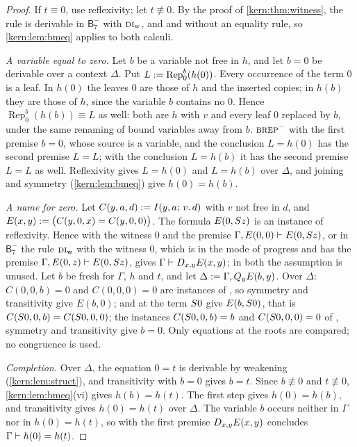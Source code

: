 \begin{proof}
If $t\equiv 0$, use reflexivity; let $t\not\equiv 0$.  By the proof of
\cref{kern:thm:witness}, the rule  is derivable in
$\mathsf{B}^{-}_{7}$ with $\rulename{DI}_{\mathrm{w}}$,  and
 and without an equality rule, so \cref{kern:lem:bmeq} applies
to both calculi.

\emph{A variable equal to zero.}  Let $b$ be a variable not free in $h$, and
let $b=0$ be derivable over a context $\Delta$.  Put
$L\mathrel{:=}\operatorname{Rep}_{0}^{b}(h(0))$.  Every occurrence of the term $0$
is a leaf.  In $h(0)$ the leaves $0$ are those of $h$ and the inserted
copies; in $h(b)$ they are those of $h$, since the variable $b$ contains no
$0$.  Hence $\operatorname{Rep}_{0}^{b}(h(b))\equiv L$ as well: both are $h$
with $v$ and every leaf $0$ replaced by $b$, under the same renaming of bound
variables away from $b$.  $\rulename{BRep}^{-}$ with the first premise $b=0$,
whose source is a variable, and the conclusion $L=h(0)$ has the second
premise $L=L$; with the conclusion $L=h(b)$ it has the second premise $L=L$
as well.  Reflexivity gives $L=h(0)$ and $L=h(b)$ over $\Delta$, and joining
and symmetry (\cref{kern:lem:bmeq}) give $h(0)=h(b)$.

\emph{A name for zero.}  Let $C(y,a,d)\mathrel{:=}I(y,a;\,v.\,d)$ with $v$ not
free in $d$, and $E(x,y)\mathrel{:=}\bigl(C(y,0,x)=C(y,0,0)\bigr)$.  The formula
$E(0,S z)$ is an instance of reflexivity.  Hence  with the
witness $0$ and the premise $\Gamma,E(0,0)\vdash E(0,S z)$, or in
$\mathsf{B}^{-}_{7}$ the rule $\rulename{DI}_{\mathrm{w}}$ with the witness
$0$, which is in the mode of progress and has the premise
$\Gamma,E(0,z)\vdash E(0,S z)$, gives $\Gamma\vdash D_{x,y}E(x,y)$; in
both the assumption is unused.  Let $b$ be fresh for $\Gamma$, $h$ and $t$,
and let $\Delta\mathrel{:=}\Gamma,Q_{y}E(b,y)$.  Over $\Delta$:
$C(0,0,b)=0$ and $C(0,0,0)=0$ are instances of , so symmetry
and transitivity give $E(b,0)$;  and  at the term
$S 0$ give $E(b,S 0)$, that is $C(S 0,0,b)=C(S 0,0,0)$; the
instances $C(S 0,0,b)=b$ and $C(S 0,0,0)=0$ of , symmetry
and transitivity give $b=0$.  Only equations at the roots are compared;
no congruence is used.

\emph{Completion.}  Over $\Delta$, the equation $0=t$ is derivable by
weakening (\cref{kern:lem:struct}), and transitivity with $b=0$ gives $b=t$.
Since $b\not\equiv 0$ and $t\not\equiv 0$, \cref{kern:lem:bmeq}(vi) gives
$h(b)=h(t)$.  The first step gives $h(0)=h(b)$, and transitivity gives
$h(0)=h(t)$ over $\Delta$.  The variable $b$ occurs neither in $\Gamma$ nor in
$h(0)=h(t)$, so  with the first premise $D_{x,y}E(x,y)$
concludes $\Gamma\vdash h(0)=h(t)$.
\end{proof}

